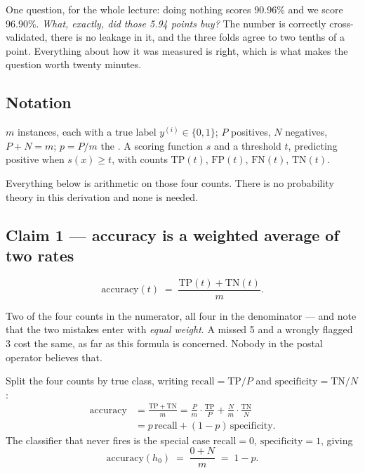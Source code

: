 \documentclass[11pt,a4paper]{article}
\begin{document}
One question, for the whole lecture: doing nothing scores 90.96\% and we score
96.90\%. \emph{What, exactly, did those 5.94 points buy?} The number is
correctly cross-validated, there is no leakage in it, and the three folds agree
to two tenths of a point. Everything about how it was measured is right, which
is what makes the question worth twenty minutes.

\subsection{Notation}

$m$ instances, each with a true label $y^{(i)} \in \{0,1\}$; $P$ positives, $N$
negatives, $P + N = m$; $p = P/m$ the . A scoring function $s$
and a threshold $t$, predicting positive when $s(x) \ge t$, with counts
$\mathrm{TP}(t)$, $\mathrm{FP}(t)$, $\mathrm{FN}(t)$, $\mathrm{TN}(t)$.

Everything below is arithmetic on those four counts. There is no probability
theory in this derivation and none is needed.

\subsection{Claim 1 --- accuracy is a weighted average of two rates}

\[ \text{accuracy}(t) \;=\;
   \frac{\mathrm{TP}(t) + \mathrm{TN}(t)}{m}. \]

Two of the four counts in the numerator, all four in the denominator --- and
note that the two mistakes enter with \emph{equal weight}. A missed 5 and a
wrongly flagged 3 cost the same, as far as this formula is concerned. Nobody in
the postal operator believes that.

\begin{derivbox}[title={The decomposition}]
Split the four counts by true class, writing
$\text{recall} = \mathrm{TP}/P$ and $\text{specificity} = \mathrm{TN}/N$:
\[
\begin{aligned}
  \text{accuracy}
  &= \frac{\mathrm{TP} + \mathrm{TN}}{m}
   = \frac{P}{m}\cdot\frac{\mathrm{TP}}{P}
   + \frac{N}{m}\cdot\frac{\mathrm{TN}}{N} \\[4pt]
  &= p\,\text{recall} + (1-p)\,\text{specificity}.
\end{aligned}
\]
The classifier that never fires is the special case $\text{recall} = 0$,
$\text{specificity} = 1$, giving
\[ \text{accuracy}(h_0) \;=\; \frac{0 + N}{m} \;=\; 1 - p. \]
\end{derivbox}
\end{document}
